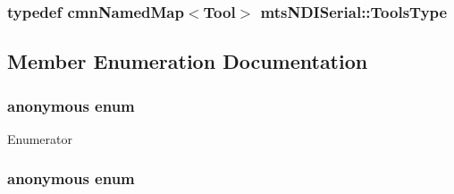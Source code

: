 \subsubsection[{Tools\+Type}]{\setlength{\rightskip}{0pt plus 5cm}typedef {\bf cmn\+Named\+Map}$<${\bf Tool}$>$ {\bf mts\+N\+D\+I\+Serial\+::\+Tools\+Type}\hspace{0.3cm}{\ttfamily [protected]}}\label{classmts_n_d_i_serial_aa7927ca6826aae84f89df0ca800fe6bd}


\subsection{Member Enumeration Documentation}
\hypertarget{classmts_n_d_i_serial_a077c962b0ae6c53794531b1f3d632a42}{}\subsubsection[{anonymous enum}]{\setlength{\rightskip}{0pt plus 5cm}anonymous enum\hspace{0.3cm}{\ttfamily [protected]}}\label{classmts_n_d_i_serial_a077c962b0ae6c53794531b1f3d632a42}
\begin{Desc}
\item[Enumerator]\par
\begin{description}
\item[{\em 
\hypertarget{classmts_n_d_i_serial_a077c962b0ae6c53794531b1f3d632a42a5a2ba9c836a108b8648fa0887336f5cd}{}M\+A\+X\+\_\+\+B\+U\+F\+F\+E\+R\+\_\+\+S\+I\+Z\+E\label{classmts_n_d_i_serial_a077c962b0ae6c53794531b1f3d632a42a5a2ba9c836a108b8648fa0887336f5cd}
}]\end{description}
\end{Desc}
\hypertarget{classmts_n_d_i_serial_acba49d9dad47662f5cc3f3379ffe0357}{}\subsubsection[{anonymous enum}]{\setlength{\rightskip}{0pt plus 5cm}anonymous enum\hspace{0.3cm}{\ttfamily [protected]}}\label{classmts_n_d_i_serial_acba49d9dad47662f5cc3f3379ffe0357}
